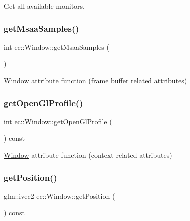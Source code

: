 Get all available monitors. \mbox{\label{classec_1_1_window_abb56cab9cdf2d1969e1552be0e2540fe}} 
\subsubsection{\texorpdfstring{get\+Msaa\+Samples()}{getMsaaSamples()}}
{\footnotesize\ttfamily int ec\+::\+Window\+::get\+Msaa\+Samples (\begin{DoxyParamCaption}{ }\end{DoxyParamCaption})\hspace{0.3cm}{\ttfamily [static]}}

\mbox{\hyperlink{classec_1_1_window}{Window}} attribute function (frame buffer related attributes) \mbox{\label{classec_1_1_window_aed94b4cfb1b984bc0787dd2c7d42c5e0}} 
\subsubsection{\texorpdfstring{get\+Open\+Gl\+Profile()}{getOpenGlProfile()}}
{\footnotesize\ttfamily int ec\+::\+Window\+::get\+Open\+Gl\+Profile (\begin{DoxyParamCaption}{ }\end{DoxyParamCaption}) const}

\mbox{\hyperlink{classec_1_1_window}{Window}} attribute function (context related attributes) \mbox{\label{classec_1_1_window_aa426ec0e5657e6f5583f28abf1f4455a}} 
\subsubsection{\texorpdfstring{get\+Position()}{getPosition()}}
{\footnotesize\ttfamily glm\+::ivec2 ec\+::\+Window\+::get\+Position (\begin{DoxyParamCaption}{ }\end{DoxyParamCaption}) const}

